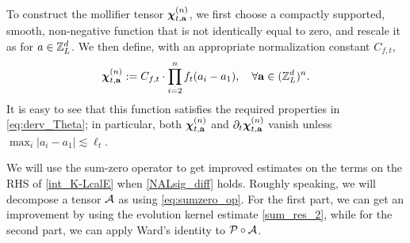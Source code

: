 

\begin{example}\label{rmk:choosechi}
To construct the mollifier tensor \(\dthn_{t,\ba}^{(n)}\), we first choose a compactly supported, smooth, non-negative function  that is not identically equal to zero, and rescale it as  for $a\in \Zn$. We then define, with an appropriate normalization constant $C_{f,t}$,  
\begin{align}
 \dthn^{(n)}_{t, \ba}:=C_{f,t}\cdot \prod_{i=2}^n   f_t(a_i-a_1) ,\quad \forall \ba\in (\Zn)^n .
\end{align}
It is easy to see that this function satisfies the required properties in \eqref{eq:derv_Theta}; in particular, both $\dthn^{(n)}_{t,\ba}$ and $\partial_t\dthn^{(n)}_{t,\ba}$ vanish unless $\max_{i}|a_i-a_1|\lesssim \ell_t$. 
\end{example}



We will use the sum-zero operator to get improved estimates on the terms on the RHS of \eqref{int_K-LcalE} when \eqref{NALsig_diff} holds. 
Roughly speaking, we will decompose a tensor $\cal A$ as  using \eqref{eq:sumzero_op}. For the first part, we can get an improvement by using the evolution kernel estimate \eqref{sum_res_2}, while for the second part, we can apply Ward's identity to ${\cal P} \circ {\cal A}$. 

